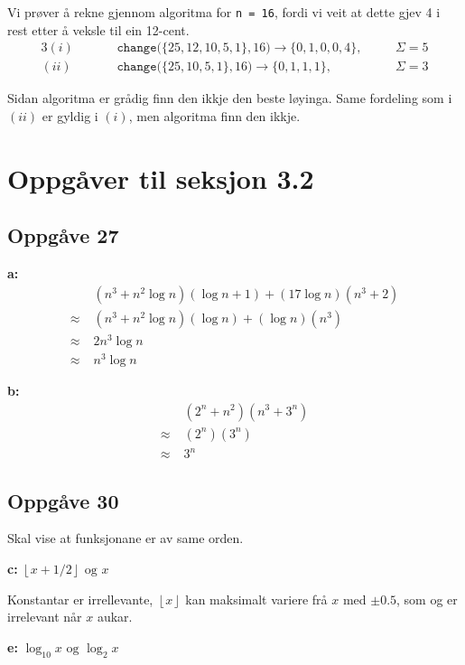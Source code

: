 \documentclass[a4paper, 11pt]{article}
\newcommand{\deloppg}[1]{\vspace{1mm}\noindent \textbf{\themecolor{#1:}}}
\newcommand{\themeshade}{Mahogany}
\newcommand{\themecolor}[1]{\textcolor{\themeshade}{#1}}
\begin{document}
Vi prøver å rekne gjennom algoritma for {\tt n = 16}, fordi vi veit at dette 
gjev 4 i rest etter å veksle til ein 12-cent.
\begin{alignat*}{3}
    (i)& \quad &&\mathtt{change(}\{25,12,10,5,1\}, 16 \mathtt{)}
        \rightarrow \{0,1,0,0,4\}, \quad &&\Sigma = 5 \\
    (ii)& &&\mathtt{change (}\{25,10,5,1\}, 16 \mathtt{)}
        \rightarrow \{0,1,1,1\}, &&\Sigma = 3
\end{alignat*}

\noindent Sidan algoritma er grådig finn den ikkje den beste løyinga. Same fordeling som i
\((ii)\) er gyldig i \((i)\), men algoritma finn den ikkje.


\newpage
\section{Oppgåver til seksjon 3.2}

\subsection*{Oppgåve 27}

\deloppg{a} 
\begin{align*}
    &\; (n^3 + n^2 \log n)(\log n + 1) + (17 \log n)(n^3 + 2) \\
    \approx &\; (n^3 + n^2 \log n)(\log n) + (\log n)(n^3) \\
    \approx &\; 2n^3 \log n \\
    \approx &\; n^3 \log  n
\end{align*}

\deloppg{b}
\begin{align*}
    &\; (2^n + n^2)(n^3 + 3^n) \\
    \approx &\; (2^n)(3^n) \\
    \approx &\; 3^n
\end{align*}


\subsection*{Oppgåve 30}
Skal vise at funksjonane er av same orden.

\deloppg{c} \(\left\lfloor x + 1/2 \right\rfloor \text{ og } x\)

\noindent Konstantar er irrellevante, \(\left\lfloor x \right\rfloor\) kan maksimalt variere frå
\(x\) med \(\pm 0.5\), som og er irrelevant når \(x\) aukar.

\vspace{2mm}
\deloppg{e} \(\log_{10} x \text{ og } \log_2 x\)
\end{document}
